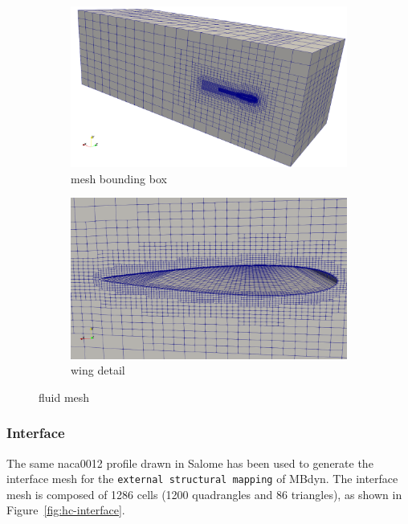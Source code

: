\begin{figure}[htbp!]
	\centering
	\begin{subfigure}{.75\textwidth}
		\centering
		\includegraphics[width=.99\linewidth]{images/heathcote/dom03.png}
		\caption{mesh bounding box}
	\end{subfigure}
	\newline
	
	\centering
	\begin{subfigure}{.75\textwidth}
		\centering
		\includegraphics[width=.99\linewidth]{images/heathcote/dom02.png}
		\caption{wing detail}
	\end{subfigure}
	\caption{fluid mesh}
	\label{fig:hc-mesh}
\end{figure}



\subsubsection{Interface}

The same naca0012 profile drawn in Salome has been used to generate the interface mesh for the \texttt{external structural mapping} of MBdyn. The interface mesh is composed of 1286 cells (1200 quadrangles and 86 triangles), as shown in Figure~\ref{fig:hc-interface}.

